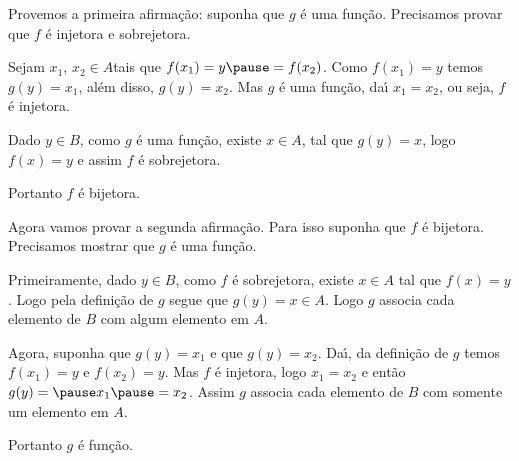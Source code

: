 \documentclass{beamer}
\begin{document}
    \begin{frame}
        Provemos a primeira afirma\c{c}\~ao: \pause suponha que $g$ \'e uma fun\c{c}\~ao. \pause Precisamos provar que $f$ {\'e} injetora \pause e sobrejetora.\pause

        \vspace{.5cm}

        Sejam $x_1$, \pause $x_2 \in A$\pause  tais que $f(x_1) = y \pause = f(x_2)$. \pause Como $f(x_1) = y$ \pause temos $g(y) = x_1$, \pause al{\'e}m disso, \pause $g(y) = x_2$. \pause Mas $g$ {\'e} uma fun{\c c}{\~a}o, \pause da{\'\i} $x_1 = x_2$, \pause ou seja, \pause $f$ {\'e} injetora.\pause
        
        \vspace{.5cm}

        Dado $y \in B$, \pause como $g$ {\'e} uma fun{\c c}{\~a}o, \pause existe $x \in A$, \pause tal que $g(y) = x$, \pause logo $f(x) = y$ \pause e assim $f$ {\'e} sobrejetora.\pause

        \vspace{.5cm}

        Portanto $f$ {\'e} bijetora.\pause
    \end{frame}

    \begin{frame}

        Agora vamos provar a segunda afirma\c{c}\~ao. \pause Para isso suponha que $f$ \'e bijetora. \pause Precisamos mostrar que $g$ \'e uma fun\c{c}\~ao. \pause

        \vspace{.5cm}

        Primeiramente, \pause dado $y \in B$, \pause como $f$ {\'e} sobrejetora, \pause existe $x \in A$ \pause tal que $f(x) = y$. \pause Logo pela defini\c{c}\~ao de $g$ \pause segue que $g(y) = x \in A$. \pause Logo $g$ associa cada elemento de $B$ \pause com algum elemento em $A$.\pause

        \vspace{.5cm}

        Agora, suponha que $g(y) = x_1$ \pause e que $g(y) = x_2$. \pause Da{\'\i}, da defini\c{c}\~ao de $g$ \pause  temos $f(x_1) = y$ \pause e $f(x_2) = y$. \pause Mas $f$ {\'e} injetora, \pause logo $x_1 = x_2$ \pause e ent{\~a}o $g(y) = \pause x_1 \pause = x_2$. \pause Assim $g$ associa cada elemento de $B$ \pause com somente um elemento em $A$.\pause

        \vspace{.5cm}

        Portanto $g$ {\'e} fun{\c c}{\~a}o.\pause
    \end{frame}
\end{document}
